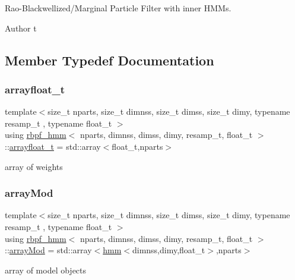 Rao-\/\+Blackwellized/\+Marginal Particle Filter with inner H\+M\+Ms. 

\begin{DoxyAuthor}{Author}
t 
\end{DoxyAuthor}


\subsection{Member Typedef Documentation}
\mbox{\label{classrbpf__hmm_aae4e776097278c6e5c25f614d7cad7bd}} 
\subsubsection{\texorpdfstring{arrayfloat\+\_\+t}{arrayfloat\_t}}
{\footnotesize\ttfamily template$<$size\+\_\+t nparts, size\+\_\+t dimnss, size\+\_\+t dimss, size\+\_\+t dimy, typename resamp\+\_\+t , typename float\+\_\+t $>$ \\
using \hyperlink{classrbpf__hmm}{rbpf\+\_\+hmm}$<$ nparts, dimnss, dimss, dimy, resamp\+\_\+t, float\+\_\+t $>$\+::\hyperlink{classrbpf__hmm_aae4e776097278c6e5c25f614d7cad7bd}{arrayfloat\+\_\+t} =  std\+::array$<$float\+\_\+t,nparts$>$}

array of weights \mbox{\label{classrbpf__hmm_a6dad2eb9cecbc6a85e348fec442c2998}} 
\subsubsection{\texorpdfstring{array\+Mod}{arrayMod}}
{\footnotesize\ttfamily template$<$size\+\_\+t nparts, size\+\_\+t dimnss, size\+\_\+t dimss, size\+\_\+t dimy, typename resamp\+\_\+t , typename float\+\_\+t $>$ \\
using \hyperlink{classrbpf__hmm}{rbpf\+\_\+hmm}$<$ nparts, dimnss, dimss, dimy, resamp\+\_\+t, float\+\_\+t $>$\+::\hyperlink{classrbpf__hmm_a6dad2eb9cecbc6a85e348fec442c2998}{array\+Mod} =  std\+::array$<$\hyperlink{classhmm}{hmm}$<$dimnss,dimy,float\+\_\+t$>$,nparts$>$}

array of model objects \mbox{\label{classrbpf__hmm_a2154906d47b4eb987fe7c238d1aace0a}} 
